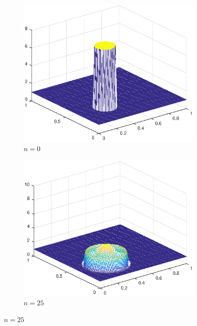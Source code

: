 \begin{figure}[h!]
    \centering
    \begin{subfigure}[t]{0.4\textwidth}
        \centering
        \includegraphics[width=\textwidth]{images/sol_ri_0000.eps}
        \caption{$n=0$}
        \label{fig:0}
    \end{subfigure}
    \begin{subfigure}[t]{0.48\textwidth}
        \centering
        \includegraphics[width=\textwidth]{images/sol_ri_0025.eps}
        \caption{$n=25$}
        \label{fig:10}
    \end{subfigure}

\end{figure}
